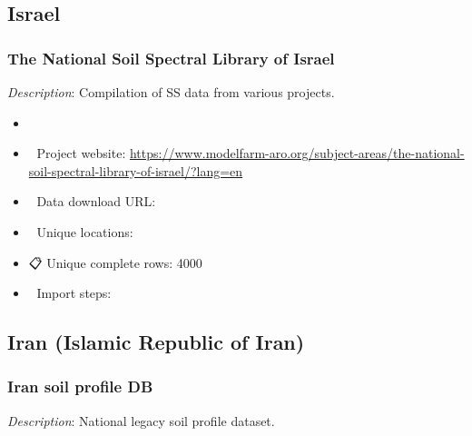 \documentclass[
  graybox,natbib,nospthms]{svmono}
\providecommand{\tightlist}{%
  \setlength{\itemsep}{0pt}\setlength{\parskip}{0pt}}
\providecommand{\tightlist}{\setlength{\itemsep}{0pt}\setlength{\parskip}{0pt}}
\begin{document}
\hypertarget{israel}{%
\subsection{Israel}\label{israel}}

\hypertarget{the-national-soil-spectral-library-of-israel}{%
\subsubsection{The National Soil Spectral Library of Israel}\label{the-national-soil-spectral-library-of-israel}}

\emph{Description}: Compilation of SS data from various projects.

\begin{itemize}
\tightlist
\item
  📕\\
\item
  🔗 Project website: \url{https://www.modelfarm-aro.org/subject-areas/the-national-soil-spectral-library-of-israel/?lang=en}\\
\item
  📂 Data download URL:\\
\item
  📍 Unique locations:\\
\item
  📋 Unique complete rows: 4000\\
\item
  📝 Import steps:
\end{itemize}

\hypertarget{iran-islamic-republic-of-iran}{%
\subsection{Iran (Islamic Republic of Iran)}\label{iran-islamic-republic-of-iran}}

\hypertarget{iran-soil-profile-db}{%
\subsubsection{Iran soil profile DB}\label{iran-soil-profile-db}}

\emph{Description}: National legacy soil profile dataset.
\end{document}
